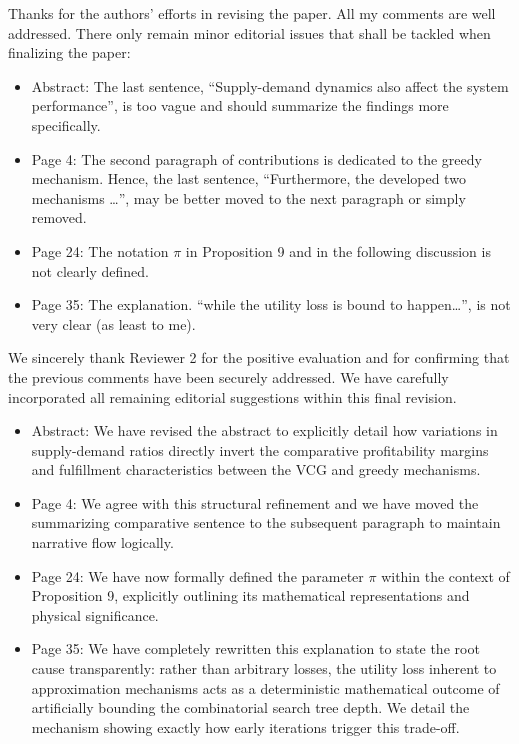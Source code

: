 \reviewer
\begin{revcomment}[2.1]
	Thanks for the authors’ efforts in revising the paper. All my comments are well addressed. There only remain minor editorial issues that shall be tackled when finalizing the paper:
\begin{itemize}
    \item Abstract: The last sentence, ``Supply-demand dynamics also affect the system performance'', is too vague and should summarize the findings more specifically. 
    \item Page 4: The second paragraph of contributions is dedicated to the greedy mechanism. Hence, the last sentence, ``Furthermore, the developed two mechanisms \dots'', may be better moved to the next paragraph or simply removed.
    \item Page 24: The notation $\pi$ in Proposition 9 and in the following discussion is not clearly defined.
    \item Page 35: The explanation. ``while the utility loss is bound to happen\dots'', is not very clear (as least to me).
\end{itemize}
\end{revcomment}

\hypertarget{Response to R2}{}
\begin{revresponse}[2.1]
	We sincerely thank Reviewer 2 for the positive evaluation and for confirming that the previous comments have been securely addressed. We have carefully incorporated all remaining editorial suggestions within this final revision. 
    \begin{itemize}
        \item Abstract: We have revised the abstract to explicitly detail how variations in supply-demand ratios directly invert the comparative profitability margins and fulfillment characteristics between the VCG and greedy mechanisms. 
        \item Page 4: We agree with this structural refinement and we have moved the summarizing comparative sentence to the subsequent paragraph to maintain narrative flow logically. 
        \item Page 24: We have now formally defined the parameter $\pi$ within the context of Proposition 9, explicitly outlining its mathematical representations and physical significance. 
        \item Page 35: We have completely rewritten this explanation to state the root cause transparently: rather than arbitrary losses, the utility loss inherent to approximation mechanisms acts as a deterministic mathematical outcome of artificially bounding the combinatorial search tree depth. We detail the mechanism showing exactly how early iterations trigger this trade-off.
    \end{itemize}
\end{revresponse}



